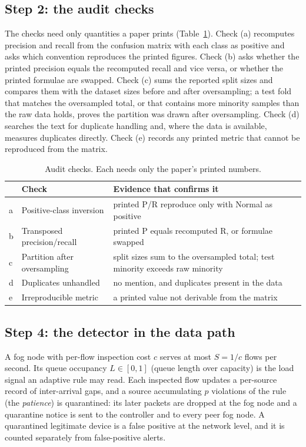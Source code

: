 \subsection{Step 2: the audit checks}
\noindent The checks need only quantities a paper prints (Table~\ref{tab:checks}). Check (a) recomputes precision and recall from the confusion matrix with each class as positive and asks which convention reproduces the printed figures. Check (b) asks whether the printed precision equals the recomputed recall and vice versa, or whether the printed formulae are swapped. Check (c) sums the reported split sizes and compares them with the dataset sizes before and after oversampling; a test fold that matches the oversampled total, or that contains more minority samples than the raw data holds, proves the partition was drawn after oversampling. Check (d) searches the text for duplicate handling and, where the data is available, measures duplicates directly. Check (e) records any printed metric that cannot be reproduced from the matrix.

\begin{table}[t]
\caption{Audit checks. Each needs only the paper's printed numbers.}
\label{tab:checks}
\centering\footnotesize
\begin{tabular}{@{}p{}p{}p{}@{}}
\toprule
& \textbf{Check} & \textbf{Evidence that confirms it} \\
\midrule
a & Positive-class inversion & printed P/R reproduce only with Normal as positive \\
b & Transposed precision/recall & printed P equals recomputed R, or formulae swapped \\
c & Partition after oversampling & split sizes sum to the oversampled total; test minority exceeds raw minority \\
d & Duplicates unhandled & no mention, and duplicates present in the data \\
e & Irreproducible metric & a printed value not derivable from the matrix \\
\bottomrule
\end{tabular}
\end{table}

\subsection{Step 4: the detector in the data path}
\noindent A fog node with per-flow inspection cost $c$ serves at most $S = 1/c$ flows per second. Its queue occupancy $L \in [0,1]$ (queue length over capacity) is the load signal an adaptive rule may read. Each inspected flow updates a per-source record of inter-arrival gaps, and a source accumulating $p$ violations of the rule (the \emph{patience}) is quarantined: its later packets are dropped at the fog node and a quarantine notice is sent to the controller and to every peer fog node. A quarantined legitimate device is a false positive at the network level, and it is counted separately from false-positive alerts.

